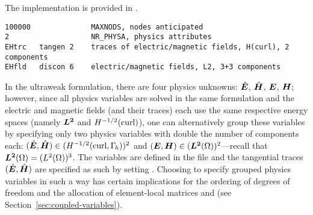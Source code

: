 The implementation is provided in .

\begin{lstlisting}[caption=\file{MAXWELL/ULTRAWEAK\_DPG/input/physics} input file.]
100000              MAXNODS, nodes anticipated
2                   NR_PHYSA, physics attributes
EHtrc   tangen 2    traces of electric/magnetic fields, H(curl), 2 components
EHfld   discon 6    electric/magnetic fields, L2, 3+3 components
\end{lstlisting}

In the ultraweak formulation, there are four physics unknowns: $\hat{\boldsymbol E}$, $\hat{\boldsymbol H}$, $\boldsymbol E$, $\boldsymbol H$; however, since all physics variables are solved in the same formulation and the electric and magnetic fields (and their traces) each use the same respective energy spaces (namely $\boldsymbol{L^2}$ and $H^{-1/2}(\text{curl})$), one can alternatively group these variables by specifying only two physics variables with double the number of components each: $(\hat{\boldsymbol E},\hat {\boldsymbol H}) \in (H^{-1/2}(\text{curl}, \Gamma_{\hskip -1pt h}))^2$ and $(\boldsymbol E, \boldsymbol H) \in (\boldsymbol{L^2}(\Omega))^2$---recall that $\boldsymbol{L^2}(\Omega) = (L^2(\Omega))^3$. The variables are defined in the  file and the tangential traces $(\hat{\boldsymbol E},\hat {\boldsymbol H})$ are specified as such by setting . Choosing to specify grouped physics variables in such a way has certain implications for the ordering of degrees of freedom and the allocation of element-local matrices  and  (see Section~\ref{sec:coupled-variables}).

